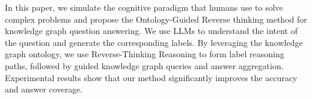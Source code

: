 In this paper, we simulate the cognitive paradigm that humans use to solve complex problems and propose the Ontology-Guided Reverse thinking method for knowledge graph question answering. We use LLMs to understand the intent of the question and generate the corresponding labels. By leveraging the knowledge graph ontology, we use Reverse-Thinking Reasoning to form label reasoning paths, followed by guided knowledge graph queries and answer aggregation. Experimental results show that our method significantly improves the accuracy and answer coverage.